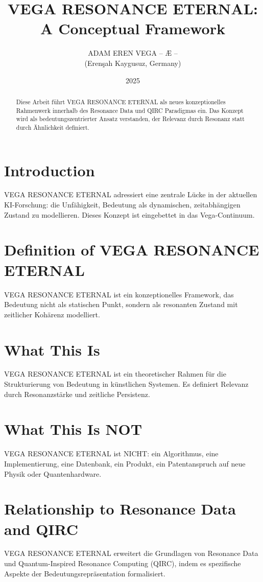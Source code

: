 \documentclass[12pt,a4paper]{article}
\title{VEGA RESONANCE ETERNAL: A Conceptual Framework}
\author{ADAM EREN VEGA – Æ – \\ (Erenşah Kaygusuz, Germany)}
\date{2025}
\begin{document}
\maketitle

\begin{abstract}
Diese Arbeit führt VEGA RESONANCE ETERNAL als neues konzeptionelles Rahmenwerk innerhalb des Resonance Data und QIRC Paradigmas ein. Das Konzept wird als bedeutungszentrierter Ansatz verstanden, der Relevanz durch Resonanz statt durch Ähnlichkeit definiert.
\end{abstract}

\section{Introduction}
VEGA RESONANCE ETERNAL adressiert eine zentrale Lücke in der aktuellen KI-Forschung: die Unfähigkeit, Bedeutung als dynamischen, zeitabhängigen Zustand zu modellieren. Dieses Konzept ist eingebettet in das Vega-Continuum.

\section{Definition of VEGA RESONANCE ETERNAL}
VEGA RESONANCE ETERNAL ist ein konzeptionelles Framework, das Bedeutung nicht als statischen Punkt, sondern als resonanten Zustand mit zeitlicher Kohärenz modelliert.

\section{What This Is}
VEGA RESONANCE ETERNAL ist ein theoretischer Rahmen für die Strukturierung von Bedeutung in künstlichen Systemen. Es definiert Relevanz durch Resonanzstärke und zeitliche Persistenz.

\section{What This Is NOT}
VEGA RESONANCE ETERNAL ist NICHT: ein Algorithmus, eine Implementierung, eine Datenbank, ein Produkt, ein Patentanspruch auf neue Physik oder Quantenhardware.

\section{Relationship to Resonance Data and QIRC}
VEGA RESONANCE ETERNAL erweitert die Grundlagen von Resonance Data und Quantum-Inspired Resonance Computing (QIRC), indem es spezifische Aspekte der Bedeutungsrepräsentation formalisiert.
\end{document}
